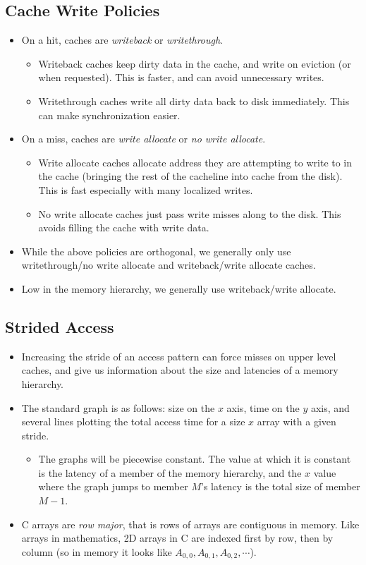\documentclass[12pt]{article}
\begin{document}
\subsection{Cache Write Policies}
\begin{itemize}
	\item On a hit, caches are \textit{writeback} or \textit{writethrough}.
		\begin{itemize}
			\item Writeback caches keep dirty data in the cache, and write on eviction (or when requested). This is faster, and can avoid unnecessary writes. 
			\item Writethrough caches write all dirty data back to disk immediately. This can make synchronization easier. 
		\end{itemize}
	\item On a miss, caches are \textit{write allocate} or \textit{no write allocate}.
		\begin{itemize}
			\item Write allocate caches allocate address they are attempting to write to in the cache (bringing the rest of the cacheline into cache from the disk). This is fast especially with many localized writes. 
			\item No write allocate caches just pass write misses along to the disk. This avoids filling the cache with write data. 
		\end{itemize}
		\newpage
	\item While the above policies are orthogonal, we generally only use writethrough/no write allocate and writeback/write allocate caches. 
	\item Low in the memory hierarchy, we generally use writeback/write allocate. 
\end{itemize}

\subsection{Strided Access}
\begin{itemize}
	\item Increasing the stride of an access pattern can force misses on upper level caches, and give us information about the size and latencies of a memory hierarchy. 
	\item The standard graph is as follows: size on the $x$ axis, time on the $y$ axis, and several lines plotting the total access time for a size $x$ array with a given stride. 
		\begin{itemize}
			\item The graphs will be piecewise constant. The value at which it is constant is the latency of a member of the memory hierarchy, and the $x$ value where the graph jumps to member $M$'s latency is the total size of member $M-1$. 
		\end{itemize}
	\item C arrays are \textit{row major}, that is rows of arrays are contiguous in memory. Like arrays in mathematics, 2D arrays in C are indexed first by row, then by column (so in memory it looks like $A_{0,0}, A_{0,1}, A_{0,2}, \cdots$).
\end{itemize}
\end{document}
